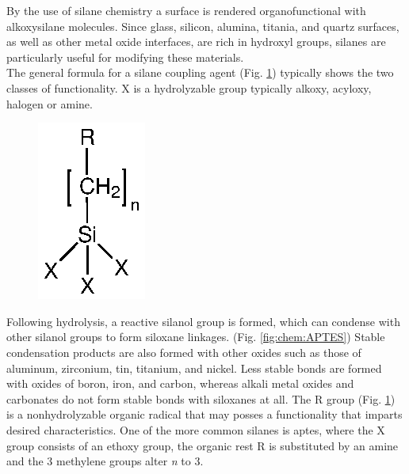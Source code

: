 By the use of silane chemistry a surface is rendered organofunctional with alkoxysilane molecules. Since glass, silicon, alumina, titania, and quartz surfaces, as well as other metal oxide interfaces, are rich in hydroxyl groups, silanes are particularly useful for modifying these materials. \cite{lit:chem:silanizingGlass}\\The general formula for a silane coupling agent (Fig. \ref{fig:chem:trialkoxysilane}) typically
shows the two classes of functionality. X is a hydrolyzable
group typically alkoxy, acyloxy, halogen or amine.
\\\begin{figure}
	\vspace{-0.7\baselineskip}
	\centering
	\includegraphics{Ressources/Chemistry/Trialkoxysilan}
	\label{fig:chem:trialkoxysilane}
\end{figure} 
Following hydrolysis, a reactive \gls{silanol} group is formed, which can condense with other silanol groups to form \gls{siloxane} linkages. 
(Fig. \ref{fig:chem:APTES}) Stable condensation products are also formed with
other oxides such as those of aluminum, zirconium, tin,
titanium, and nickel. Less stable bonds are formed with
oxides of boron, iron, and carbon, whereas alkali metal oxides and
carbonates do not form stable bonds with \glspl{siloxane} at all. The R group (Fig. \ref{fig:chem:trialkoxysilane}) is a nonhydrolyzable organic radical that may posses a functionality that imparts desired characteristics. One of the more common silanes is \gls{aptes}, where the X group consists of an \gls{ethoxy} group, the organic rest R is substituted by an \gls{amine} and the 3 \gls{methylene} groups alter \textit{n} to 3. \cite{lit:chem:GELEST} 
